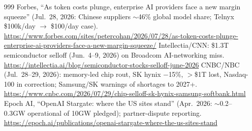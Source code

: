 \begin{thebibliography}{999}
 Forbes, ``As token costs plunge, enterprise AI providers face a new margin squeeze'' (Jul.\ 28, 2026: Chinese suppliers $\sim$46\% global model share; Telnyx \$100k/day $\rightarrow$ \$100/day case). \url{https://www.forbes.com/sites/petercohan/2026/07/28/as-token-costs-plunge-enterprise-ai-providers-face-a-new-margin-squeeze/}
 Intellectia/CNN: \$1.3T semiconductor selloff (Jun.\ 4--9, 2026) on Broadcom AI-networking miss. \url{https://intellectia.ai/blog/semiconductor-stocks-selloff-june-2026}
 CNBC/NBC (Jul.\ 28--29, 2026): memory-led chip rout, SK hynix $-$15\%, $>$\$1T lost, Nasdaq-100 in correction; Samsung/SK warnings of shortages to 2027+. \url{https://www.cnbc.com/2026/07/29/chip-selloff-sk-hynix-samsung-softbank.html}
 Epoch AI, ``OpenAI Stargate: where the US sites stand'' (Apr.\ 2026: $\sim$0.2--0.3GW operational of 10GW pledged); partner-dispute reporting. \url{https://epoch.ai/publications/openai-stargate-where-the-us-sites-stand}


\end{thebibliography}
